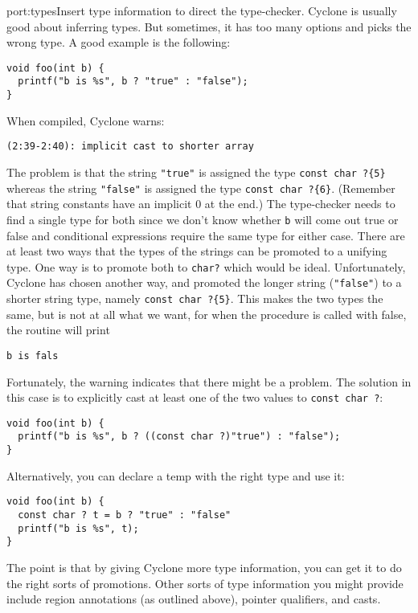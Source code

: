 \begin{porta}{port:types}{Insert type information to direct the type-checker.}
Cyclone is usually good about inferring types.  But sometimes, it
has too many options and picks the wrong type.  A good example is
the following:
\begin{verbatim}
void foo(int b) {
  printf("b is %s", b ? "true" : "false");
} 
\end{verbatim}

When compiled, Cyclone warns:
\begin{verbatim}
(2:39-2:40): implicit cast to shorter array
\end{verbatim}

The problem is that the string \texttt{"true"} is assigned the
type \texttt{const char ?\{5\}} whereas the string
\texttt{"false"} is assigned the type \texttt{const char ?\{6\}}.
(Remember that string constants have an implicit 0 at the end.)
The type-checker needs to find a single type for both since
we don't know whether \texttt{b} will come out true or false
and conditional expressions require the same type for either
case.  There are at least two ways that the types of the strings can be
promoted to a unifying type.  One way is to promote both
to \texttt{char?} which would be ideal.  Unfortunately, Cyclone
has chosen another way, and promoted the longer string
(\texttt{"false"}) to a shorter string type, namely
\texttt{const char ?\{5\}}.  This makes the two types the
same, but is not at all what we want, for when the procedure
is called with false, the routine will print
\begin{verbatim}
b is fals
\end{verbatim}

Fortunately, the warning indicates that there might be a problem.
The solution in this case is to explicitly cast at least one of the two
values to \texttt{const char ?}:
\begin{verbatim}
void foo(int b) {
  printf("b is %s", b ? ((const char ?)"true") : "false");
} 
\end{verbatim}

Alternatively, you can declare a temp with the right type and use
it:
\begin{verbatim}
void foo(int b) {
  const char ? t = b ? "true" : "false"
  printf("b is %s", t);
} 
\end{verbatim}

The point is that by giving Cyclone more type information, you can
get it to do the right sorts of promotions.  Other sorts of type
information you might provide include region annotations (as outlined
above), pointer qualifiers, and casts.
\end{porta}


